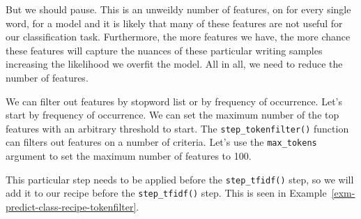 \documentclass[
  letterpaper,
  krantz1]{latex/krantz-mod}
\theoremstyle{definition}
\theoremstyle{definition}
\theoremstyle{remark}
\begin{document}
But we should pause. This is an unweildy number of features, on for
every single word, for a model and it is likely that many of these
features are not useful for our classification task. Furthermore, the
more features we have, the more chance these features will capture the
nuances of these particular writing samples increasing the likelihood we
overfit the model. All in all, we need to reduce the number of features.

We can filter out features by stopword list or by frequency of
occurrence. Let's start by frequency of occurrence. We can set the
maximum number of the top features with an arbitrary threshold to start.
The \texttt{step\_tokenfilter()} function can filters out features on a
number of criteria. Let's use the \texttt{max\_tokens} argument to set
the maximum number of features to 100.

This particular step needs to be applied before the
\texttt{step\_tfidf()} step, so we will add it to our recipe before the
\texttt{step\_tfidf()} step. This is seen in
Example~\ref{exm-predict-class-recipe-tokenfilter}.
\end{document}
